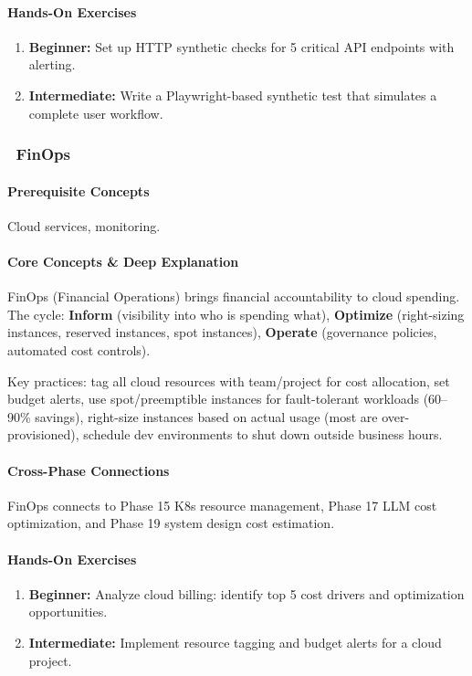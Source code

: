 \documentclass[11pt, a4paper, oneside]{report}
\newcommand{\awareness}[1]{\subsubsection{\texorpdfstring{\fcolorbox{gray!50}{gray!10}{\footnotesize\bfseries\color{gray!50!black} AWARENESS}~#1}{#1}}}
\begin{document}
\paragraph{Hands-On Exercises}
\begin{enumerate}[leftmargin=*]
\item \textbf{Beginner:} Set up HTTP synthetic checks for 5 critical API endpoints with alerting.
\item \textbf{Intermediate:} Write a Playwright-based synthetic test that simulates a complete user workflow.
\end{enumerate}

\awareness{FinOps}

\paragraph{Prerequisite Concepts} Cloud services, monitoring.

\paragraph{Core Concepts \& Deep Explanation} FinOps (Financial Operations) brings financial accountability to cloud spending. The cycle: \textbf{Inform} (visibility into who is spending what), \textbf{Optimize} (right-sizing instances, reserved instances, spot instances), \textbf{Operate} (governance policies, automated cost controls).

Key practices: tag all cloud resources with team/project for cost allocation, set budget alerts, use spot/preemptible instances for fault-tolerant workloads (60--90\% savings), right-size instances based on actual usage (most are over-provisioned), schedule dev environments to shut down outside business hours.

\paragraph{Cross-Phase Connections} FinOps connects to Phase 15 K8s resource management, Phase 17 LLM cost optimization, and Phase 19 system design cost estimation.

\paragraph{Hands-On Exercises}
\begin{enumerate}[leftmargin=*]
\item \textbf{Beginner:} Analyze cloud billing: identify top 5 cost drivers and optimization opportunities.
\item \textbf{Intermediate:} Implement resource tagging and budget alerts for a cloud project.
\end{enumerate}
\end{document}
